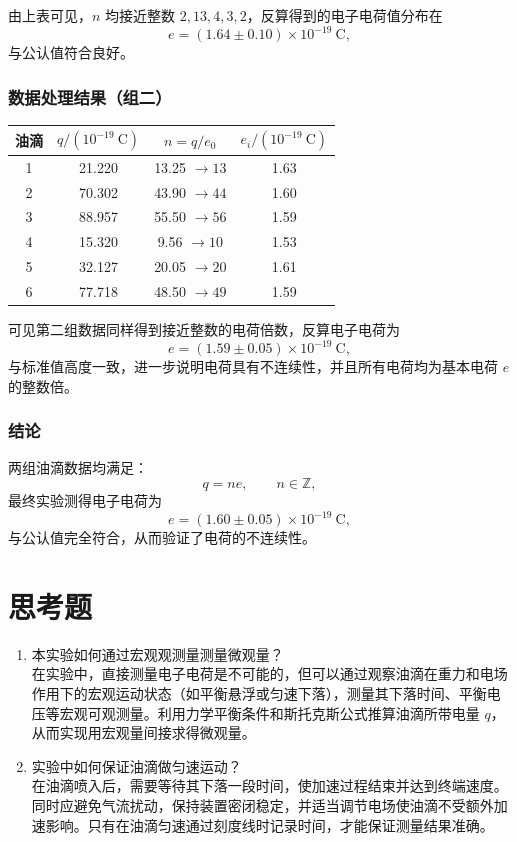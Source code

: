 \documentclass[a4paper,8pt,twocolumn]{article}
\begin{document}
由上表可见，$n$ 均接近整数 $2, 13, 4, 3, 2$，反算得到的电子电荷值分布在
\[
e = (1.64 \pm 0.10)\times 10^{-19}\ \mathrm{C},
\]
与公认值符合良好。

\subsubsection*{数据处理结果（组二）}

\begin{table}[H]
\centering
\begin{tabular}{c c c c}
\hline
油滴 & $q/(10^{-19}\ \mathrm{C})$ & $n = q/e_0$ & $e_i/(10^{-19}\ \mathrm{C})$ \\
\hline
1 & 21.220 & 13.25 $\rightarrow 13$ & 1.63 \\
2 & 70.302 & 43.90 $\rightarrow 44$ & 1.60 \\
3 & 88.957 & 55.50 $\rightarrow 56$ & 1.59 \\
4 & 15.320 & 9.56  $\rightarrow 10$ & 1.53 \\
5 & 32.127 & 20.05 $\rightarrow 20$ & 1.61 \\
6 & 77.718 & 48.50 $\rightarrow 49$ & 1.59 \\
\hline
\end{tabular}
\end{table}

可见第二组数据同样得到接近整数的电荷倍数，反算电子电荷为
\[
e = (1.59 \pm 0.05)\times 10^{-19}\ \mathrm{C},
\]
与标准值高度一致，进一步说明电荷具有不连续性，并且所有电荷均为基本电荷 $e$ 的整数倍。

\subsubsection*{结论}

两组油滴数据均满足：
\[
q = ne,
\qquad n \in \mathbb{Z},
\]
最终实验测得电子电荷为
\[
e = (1.60 \pm 0.05)\times 10^{-19}\ \mathrm{C},
\]
与公认值完全符合，从而验证了电荷的不连续性。


\section{思考题}

\begin{enumerate}
  \item 本实验如何通过宏观观测量测量微观量？\\[0.3em]
  在实验中，直接测量电子电荷是不可能的，但可以通过观察油滴在重力和电场作用下的宏观运动状态（如平衡悬浮或匀速下落），测量其下落时间、平衡电压等宏观可观测量。利用力学平衡条件和斯托克斯公式推算油滴所带电量 $q$，从而实现用宏观量间接求得微观量。

  \item 实验中如何保证油滴做匀速运动？\\[0.3em]
  在油滴喷入后，需要等待其下落一段时间，使加速过程结束并达到终端速度。同时应避免气流扰动，保持装置密闭稳定，并适当调节电场使油滴不受额外加速影响。只有在油滴匀速通过刻度线时记录时间，才能保证测量结果准确。
\end{enumerate}
\end{document}
